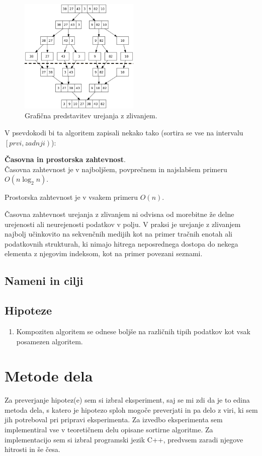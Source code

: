 \documentclass[a4paper,oneside]{article}
\begin{document}
\begin{figure}[h]
    \begin{center}
        \includegraphics[height=55mm]{slike/merge_sort.png}
    \end{center}
    \vspace{-0.7cm}
    \caption{Grafična predstavitev urejanja z zlivanjem.}
    \label{fig:mergesortimage}
\end{figure}

V psevdokodi bi ta algoritem zapisali nekako tako (sortira se vse na intervalu
$\left[prvi, zadnji\right)$):


\textbf{Časovna in prostorska zahtevnost}. \\
Časovna zahtevnost je v najboljšem, povprečnem in najslabšem primeru $O(n\log_2 n)$.

Prostorska zahtevnost je v vsakem primeru $O(n)$. %

Časovna zahtevnost urejanja z zlivanjem ni odvisna od morebitne že delne urejenosti ali
neurejenosti podatkov v polju. V praksi je urejanje z zlivanjem najbolj učinkovito na
sekvenčnih medijih kot na primer tračnih enotah ali podatkovnih strukturah, ki nimajo hitrega
neposrednega dostopa do nekega elementa z njegovim indeksom, kot na primer povezani seznami.


\subsection{Nameni in cilji}
\subsection{Hipoteze}
\begin{enumerate}
  \item Kompoziten algoritem se odnese boljše na različnih tipih podatkov kot vsak
    posamezen algoritem.
\end{enumerate}
\section{Metode dela}
Za preverjanje hipotez(e) sem si izbral eksperiment, saj se mi zdi da je to edina metoda
dela, s katero je hipotezo sploh mogoče preverjati in pa delo z viri, ki sem jih
potreboval pri pripravi eksperimenta.
Za izvedbo eksperimenta sem implementiral vse v teoretičnem delu opisane sortirne
algoritme. Za implementacijo sem si izbral programski jezik C++, predvsem zaradi njegove
hitrosti in še česa. %
\end{document}
